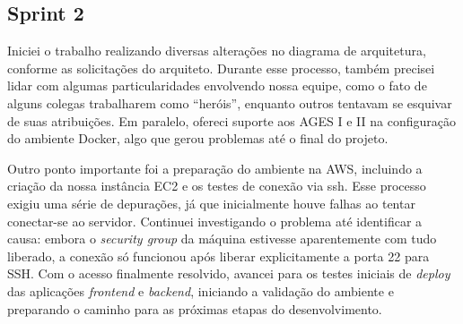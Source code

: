 \subsection{Sprint 2}

Iniciei o trabalho realizando diversas alterações no diagrama de arquitetura, conforme as solicitações do arquiteto. Durante esse processo, também precisei lidar com algumas particularidades envolvendo nossa equipe, como o fato de alguns colegas trabalharem como “heróis”, enquanto outros tentavam se esquivar de suas atribuições. Em paralelo, ofereci suporte aos AGES I e II na configuração do ambiente Docker, algo que gerou problemas até o final do projeto.

Outro ponto importante foi a preparação do ambiente na AWS, incluindo a criação da nossa instância EC2 e os testes de conexão via \ac{ssh}. Esse processo exigiu uma série de depurações, já que inicialmente houve falhas ao tentar conectar-se ao servidor. Continuei investigando o problema até identificar a causa: embora o \textit{security group} da máquina estivesse aparentemente com tudo liberado, a conexão só funcionou após liberar explicitamente a porta 22 para SSH. Com o acesso finalmente resolvido, avancei para os testes iniciais de \textit{deploy} das aplicações \textit{frontend} e \textit{backend}, iniciando a validação do ambiente e preparando o caminho para as próximas etapas do desenvolvimento.
\\

\noindent{}
